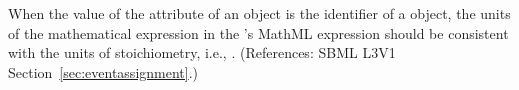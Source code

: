 When the value of the attribute  of an \EventAssignment
object is the identifier of a \SpeciesReference object, the units of the
mathematical expression in the \EventAssignment's MathML 
expression should be consistent with the units of stoichiometry, i.e.,
.  (References: SBML L3V1
Section~\ref{sec:eventassignment}.)
